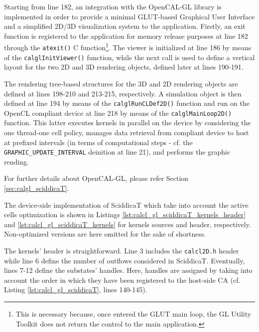Starting from line 182, an integration with the OpenCAL-GL library is
implemented in order to provide a minimal GLUT-based Graphical User
Interface and a simplified 2D/3D visualization system to the
application. Firstly, an exit function is registered to the
application for memory release purposes at line 182 through the
\verb'atexit()' C function\footnote{This is necessary because, once
  entered the GLUT main loop, the GL Utility Toolkit does not return
  the control to the main application.}. The viewer is initialized at
line 186 by means of the \verb'calglInitViewer()' function, while the
next call is used to define a vertical layout for the two 2D and 3D
rendering objects, defined later at lines 190-191.

The rendering tree-based structures for the 3D and 2D rendering
objects are defined at lines 198-210 and 213-215, respectively. A
simulation object is then defined at line 194 by means of the
\verb'calglRunCLDef2D()' function and run on the OpenCL compliant
device at line 218 by means of the \verb'calglMainLoop2D()'
function. This latter executes kernels in parallel on the device by
considering the one thread-one cell policy, manages data retrieval
from compliant device to host at prefixed intervals (in terms of
computational steps - cf. the \verb'GRAPHIC_UPDATE_INTERVAL' deinition
at line 21), and performs the graphic rending.

For further details about OpenCAL-GL, please refer Section \ref{sec:calgl_sciddicaT}.





The device-side implementation of SciddicaT which take into account
the active cells optimization is shown in Listings
\ref{lst:calcl_gl_sciddicaT_kernels_header} and
\ref{lst:calcl_gl_sciddicaT_kernels} for kernels sources and header,
respectively. Non-optimized versions are here omitted for the sake of
shortness.

The kernels' header is straightforward. Line 3 includes the
\verb'calcl2D.h' header while line 6 define the number of outflows
considered in SciddicaT. Eventually, lines 7-12 define the substates'
handles. Here, handles are assigned by taking into account the order
in which they have been registered to the host-side CA (cf. Listing
\ref{lst:calcl_gl_sciddicaT}, lines 140-145).

